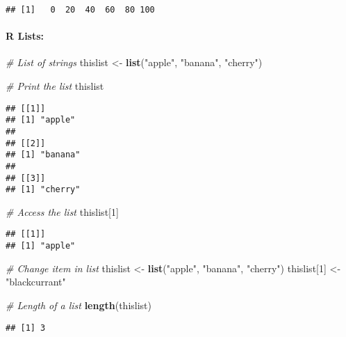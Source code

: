\documentclass[
]{article}
\newenvironment{Shaded}{\begin{snugshade}}{\end{snugshade}}
\newcommand{\CommentTok}[1]{\textcolor[rgb]{0.56,0.35,0.01}{\textit{#1}}}
\newcommand{\DecValTok}[1]{\textcolor[rgb]{0.00,0.00,0.81}{#1}}
\newcommand{\FunctionTok}[1]{\textcolor[rgb]{0.13,0.29,0.53}{\textbf{#1}}}
\newcommand{\NormalTok}[1]{#1}
\newcommand{\OtherTok}[1]{\textcolor[rgb]{0.56,0.35,0.01}{#1}}
\newcommand{\StringTok}[1]{\textcolor[rgb]{0.31,0.60,0.02}{#1}}
\begin{document}
\begin{verbatim}
## [1]   0  20  40  60  80 100
\end{verbatim}

\hypertarget{r-lists-1}{%
\paragraph{R Lists:}\label{r-lists-1}}

\begin{Shaded}
\begin{Highlighting}[]
\CommentTok{\# List of strings}
\NormalTok{thislist }\OtherTok{\textless{}{-}} \FunctionTok{list}\NormalTok{(}\StringTok{"apple"}\NormalTok{, }\StringTok{"banana"}\NormalTok{, }\StringTok{"cherry"}\NormalTok{)}

\CommentTok{\# Print the list}
\NormalTok{thislist}
\end{Highlighting}
\end{Shaded}

\begin{verbatim}
## [[1]]
## [1] "apple"
## 
## [[2]]
## [1] "banana"
## 
## [[3]]
## [1] "cherry"
\end{verbatim}

\begin{Shaded}
\begin{Highlighting}[]
\CommentTok{\# Access the list}
\NormalTok{thislist[}\DecValTok{1}\NormalTok{]}
\end{Highlighting}
\end{Shaded}

\begin{verbatim}
## [[1]]
## [1] "apple"
\end{verbatim}

\begin{Shaded}
\begin{Highlighting}[]
\CommentTok{\# Change item in list}
\NormalTok{thislist }\OtherTok{\textless{}{-}} \FunctionTok{list}\NormalTok{(}\StringTok{"apple"}\NormalTok{, }\StringTok{"banana"}\NormalTok{, }\StringTok{"cherry"}\NormalTok{)}
\NormalTok{thislist[}\DecValTok{1}\NormalTok{] }\OtherTok{\textless{}{-}} \StringTok{"blackcurrant"}

\CommentTok{\# Length of a list}
\FunctionTok{length}\NormalTok{(thislist)}
\end{Highlighting}
\end{Shaded}

\begin{verbatim}
## [1] 3
\end{verbatim}
\end{document}
